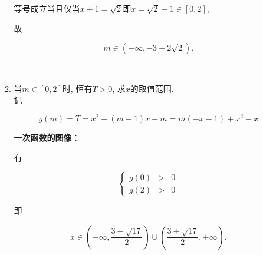 \documentclass[8pt]{article}
\begin{document}
\begin{enumerate}[label=\arabic*.]
\begin{enumerate}[label=(\arabic*)]
					等号成立当且仅当$x+1=\sqrt{2}$即$x=\sqrt{2}-1\in[0, 2]$,

					故

					$$m\in\left(-\infty, -3+2\sqrt{2}\right).$$

				~\\

				\item 当$m\in[0, 2]$时, 恒有$T>0$, 求$x$的取值范围.
					~\\

					记

					$$g(m)=T=x^2-(m+1)x-m=m(-x-1)+x^2-x$$

					\textbf{一次函数的图像}：

					有

					$$\left\{\begin{array}{rcl}g(0)&>&0\\g(2)&>&0\end{array}\right.$$

					即

					$$x\in\left(-\infty, \frac{3-\sqrt{17}}{2}\right) \cup \left(\frac{3+\sqrt{17}}{2}, +\infty\right).$$

			\end{enumerate}

	\end{enumerate}
\end{document}
